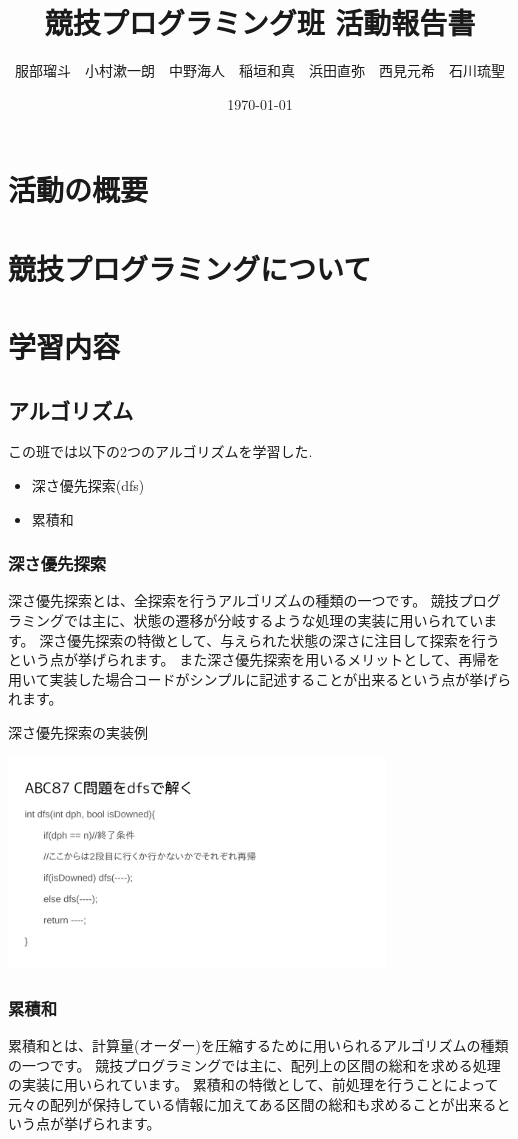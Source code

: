 \documentclass[11pt,a4paper]{jsarticle}
\title{競技プログラミング班 活動報告書}
\author{服部瑠斗　小村漱一朗　中野海人　稲垣和真　浜田直弥　西見元希　石川琉聖}
\date{\today}
\begin{document}
\maketitle
%
%
\section{活動の概要}
\section{競技プログラミングについて}
\section{学習内容}

\subsection{アルゴリズム}
この班では以下の2つのアルゴリズムを学習した.
\begin{itemize}
    \item 深さ優先探索(dfs)
    \item 累積和
\end{itemize}

\subsubsection{深さ優先探索}
深さ優先探索とは、全探索を行うアルゴリズムの種類の一つです。
競技プログラミングでは主に、状態の遷移が分岐するような処理の実装に用いられています。
深さ優先探索の特徴として、与えられた状態の深さに注目して探索を行うという点が挙げられます。
また深さ優先探索を用いるメリットとして、再帰を用いて実装した場合コードがシンプルに記述することが出来るという点が挙げられます。

深さ優先探索の実装例

\includegraphics[width=10cm]{dfs.png}

\subsubsection{累積和}
累積和とは、計算量(オーダー)を圧縮するために用いられるアルゴリズムの種類の一つです。
競技プログラミングでは主に、配列上の区間の総和を求める処理の実装に用いられています。
累積和の特徴として、前処理を行うことによって元々の配列が保持している情報に加えてある区間の総和も求めることが出来るという点が挙げられます。
\end{document}
